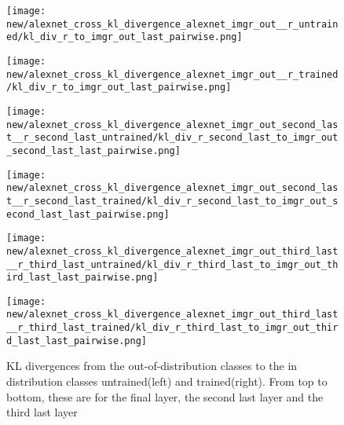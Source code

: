 \documentclass{article}
\begin{document}
            \begin{figure}[H]
                \centering
                \begin{minipage}{0.45\textwidth}
                    \centering
                    \texttt{[image: new/alexnet\_cross\_kl\_divergence\_alexnet\_imgr\_out\_\_r\_untrained/kl\_div\_r\_to\_imgr\_out\_last\_pairwise.png]}
                    
                \end{minipage}\hfill
                \begin{minipage}{0.45\textwidth}
                    \centering
                    \texttt{[image: new/alexnet\_cross\_kl\_divergence\_alexnet\_imgr\_out\_\_r\_trained/kl\_div\_r\_to\_imgr\_out\_last\_pairwise.png]}
                \end{minipage}
                \begin{minipage}{0.45\textwidth}
                    \centering
                    \texttt{[image: new/alexnet\_cross\_kl\_divergence\_alexnet\_imgr\_out\_second\_last\_\_r\_second\_last\_untrained/kl\_div\_r\_second\_last\_to\_imgr\_out\_second\_last\_last\_pairwise.png]}
                    
                \end{minipage}\hfill
                \begin{minipage}{0.45\textwidth}
                    \centering
                    \texttt{[image: new/alexnet\_cross\_kl\_divergence\_alexnet\_imgr\_out\_second\_last\_\_r\_second\_last\_trained/kl\_div\_r\_second\_last\_to\_imgr\_out\_second\_last\_last\_pairwise.png]}
                \end{minipage}
                \begin{minipage}{0.45\textwidth}
                    \centering
                    \texttt{[image: new/alexnet\_cross\_kl\_divergence\_alexnet\_imgr\_out\_third\_last\_\_r\_third\_last\_untrained/kl\_div\_r\_third\_last\_to\_imgr\_out\_third\_last\_last\_pairwise.png]}
                    
                \end{minipage}\hfill
                \begin{minipage}{0.45\textwidth}
                    \centering
                    \texttt{[image: new/alexnet\_cross\_kl\_divergence\_alexnet\_imgr\_out\_third\_last\_\_r\_third\_last\_trained/kl\_div\_r\_third\_last\_to\_imgr\_out\_third\_last\_last\_pairwise.png]}
                \end{minipage}
                \caption{KL divergences from the out-of-distribution classes to the in distribution classes untrained(left) and trained(right). From top to bottom, these are for the final layer, the second last layer and the third last layer}
                \label{fig:cross_kl_divergence_b_to_a}
            \end{figure}
        
\end{document}
